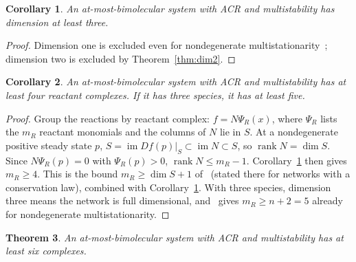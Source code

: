 \documentclass[11pt]{amsart}
\newtheorem{theorem}{Theorem}[section]
\newtheorem{corollary}[theorem]{Corollary}
\theoremstyle{definition}
\theoremstyle{remark}
\begin{document}
\begin{corollary}\label{cor:dim}
An at-most-bimolecular system with ACR and multistability has dimension at least three.
\end{corollary}

\begin{proof}
Dimension one is excluded even for nondegenerate multistationarity~\cite[Proposition~3.10 and Lemma~3.20]{kns2024}; dimension two is excluded by Theorem~\ref{thm:dim2}.
\end{proof}

\begin{corollary}\label{cor:reactants}
An at-most-bimolecular system with ACR and multistability has at least four reactant complexes. If it has three species, it has at least five.
\end{corollary}

\begin{proof}
Group the reactions by reactant complex: $f=N\Psi_R(x)$, where $\Psi_R$ lists the $m_R$ reactant monomials and the columns of $N$ lie in $S$. At a nondegenerate positive steady state $p$, $S=\operatorname{im}Df(p)|_S\subset\operatorname{im}N\subset S$, so $\operatorname{rank}N=\dim S$. Since $N\Psi_R(p)=0$ with $\Psi_R(p)>0$, $\operatorname{rank}N\le m_R-1$. Corollary~\ref{cor:dim} then gives $m_R\ge4$. This is the bound $m_R\ge\dim S+1$ of~\cite[Theorem~5.5]{kns2024} (stated there for networks with a conservation law), combined with Corollary~\ref{cor:dim}. With three species, dimension three means the network is full dimensional, and~\cite[Theorem~1.2(4)]{kns2024} gives $m_R\ge n+2=5$ already for nondegenerate multistationarity.
\end{proof}

\begin{theorem}\label{thm:cpx}
An at-most-bimolecular system with ACR and multistability has at least six complexes.
\end{theorem}
\end{document}
